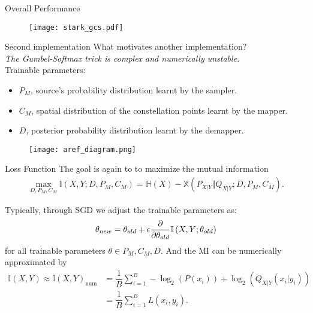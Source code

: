 \documentclass[english,aspectratio=1610,9pt,helvet,nicetitles]{ICEbeamerTUMCD}
\begin{document}
\begin{frame}{Overall Performance}
\begin{figure}[H]
	\centering
	\texttt{[image: stark\_gcs.pdf]}
    \label{fig:starkPerf}
\end{figure}
\end{frame}

\begin{frame}{Second implementation \cite{Aref}}
	What motivates another implementation?\\
	\textit{The Gumbel-Softmax trick is complex and numerically unstable.\\}
	Trainable parameters:
	\vspace{-5mm}
	\begin{itemize}
		\item $P_M$, source's probability distribution learnt by the sampler.
		\item $C_M$, spatial distribution of the constellation points learnt by the mapper.
		\item $D$, posterior probability distribution learnt by the demapper.
	\end{itemize}
	
    \begin{figure}
		\centering
		\texttt{[image: aref\_diagram.png]}
		\label{fig:arefAe}
	\end{figure}
\end{frame}

\begin{frame}{Loss Function}
	The goal is again to to maximize the mutual information
	\begin{align}
		 \max_{D, P_M, C_M} \mathbb{I} \left(X , Y ; D, P_M, C_M \right) = \mathbb{H}(X) - \mathbb{X}(P_{X|Y} \Vert Q_{X|Y} ; D, P_M, C_M).
	\end{align}
	
	Typically, through SGD we adjust the trainable parameters as:
	\begin{align}
		\theta_{new} = \theta_{old} + \epsilon \pdv{\theta_{old}} \mathbb{I} \left(X , Y ; \theta_{old} \right)
	\end{align}
	for all trainable parameters $\theta \in P_M, C_M, D$. And the MI can be numerically approximated by
	\begin{align}
		\mathbb{I} \left(X , Y\right) \approx \mathbb{I} \left(X , Y\right)_{\text{num}} &= \dfrac{1}{B} \sum \limits_{i = 1}^{B} - \log_2(P(x_i)) + \log_2(Q_{X|Y}(x_i|y_i))\\
		&= \dfrac{1}{B} \sum \limits_{i = 1}^{B} L(x_i, y_i).
	\end{align}
\end{frame}
\end{document}
